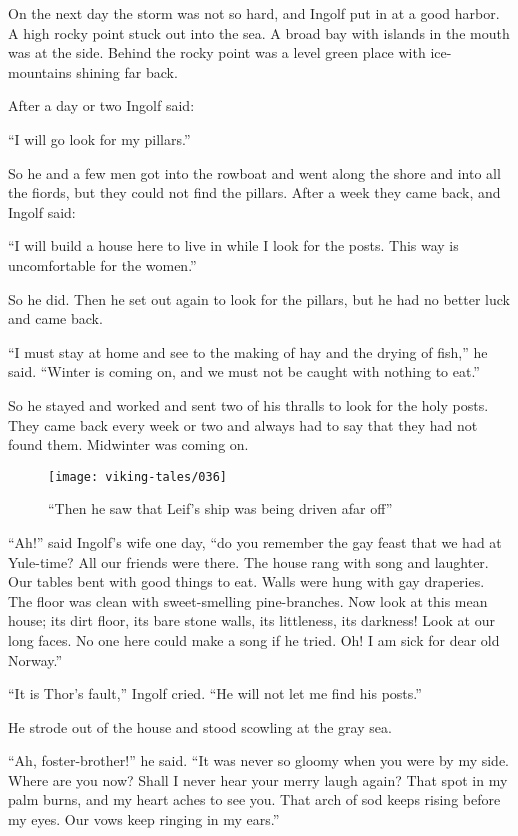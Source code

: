 On the next day the storm was not so hard, and Ingolf put in at a good
harbor. A high rocky point stuck out into the sea. A broad bay with
islands in the mouth was at the side. Behind the rocky point was a level
green place with ice-mountains shining far back.

After a day or two Ingolf said:

``I will go look for my pillars.''

So he and a few men got into the rowboat and went along the shore and
into all the fiords, but they could not find the pillars. After a week
they came back, and Ingolf said:

``I will build a house here to live in while I look for the posts. This
way is uncomfortable for the women.''

So he did. Then he set out again to look for the pillars, but he had no
better luck and came back.

``I must stay at home and see to the making of hay and the drying of
fish,'' he said. ``Winter is coming on, and we must not be caught with
nothing to eat.''

So he stayed and worked and sent two of his thralls to look for the holy
posts. They came back every week or two and always had to say that they
had not found them. Midwinter was coming on.

\begin{figure}[ht]
    \centering
    \texttt{[image: viking-tales/036]}
    \caption{``Then he saw that Leif's ship was being driven afar off''}
\end{figure}

``Ah!'' said Ingolf's wife one day, ``do you remember the gay feast that
we had at Yule-time? All our friends were there. The house rang with
song and laughter. Our tables bent with good things to eat. Walls were
hung with gay draperies. The floor was clean with sweet-smelling
pine-branches. Now look at this mean house; its dirt floor, its bare
stone walls, its littleness, its darkness! Look at our long faces. No
one here could make a song if he tried. Oh! I am sick for dear old
Norway.''

``It is Thor's fault,'' Ingolf cried. ``He will not let me find his
posts.''

He strode out of the house and stood scowling at the gray sea.

``Ah, foster-brother!'' he said. ``It was never so gloomy when you were
by my side. Where are you now? Shall I never hear your merry laugh
again? That spot in my palm burns, and my heart aches to see you. That
arch of sod keeps rising before my eyes. Our vows keep ringing in my
ears.''

